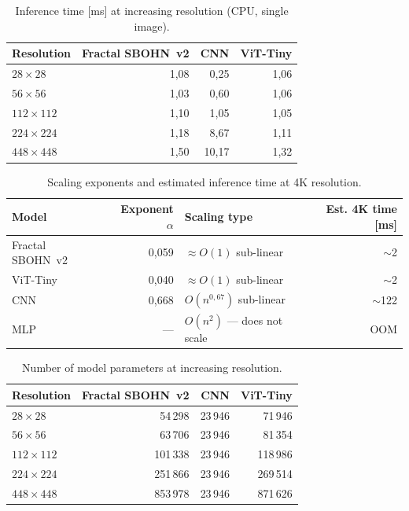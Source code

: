 \begin{table}[htbp]
\centering
\caption{Inference time [ms] at increasing resolution (CPU, single image).}
\label{tab:sota_inference}
\begin{tabular}{|l|r|r|r|}
\hline
\textbf{Resolution} & \textbf{Fractal SBOHN~v2} & \textbf{CNN} & \textbf{ViT-Tiny} \\
\hline
$28\times28$ & 1,08 & 0,25 & 1,06 \\
\hline
$56\times56$ & 1,03 & 0,60 & 1,06 \\
\hline
$112\times112$ & 1,10 & 1,05 & 1,05 \\
\hline
$224\times224$ & 1,18 & 8,67 & 1,11 \\
\hline
$448\times448$ & 1,50 & 10,17 & 1,32 \\
\hline
\end{tabular}
\end{table}

\begin{table}[htbp]
\centering
\caption{Scaling exponents and estimated inference time at 4K resolution.}
\label{tab:sota_scaling}
\begin{tabular}{|l|r|l|r|}
\hline
\textbf{Model} & \textbf{Exponent $\alpha$} & \textbf{Scaling type} & \textbf{Est. 4K time [ms]} \\
\hline
Fractal SBOHN~v2 & 0,059 & $\approx O(1)$ sub-linear & $\sim$2 \\
\hline
ViT-Tiny & 0,040 & $\approx O(1)$ sub-linear & $\sim$2 \\
\hline
CNN & 0,668 & $O(n^{0{,}67})$ sub-linear & $\sim$122 \\
\hline
MLP & --- & $O(n^2)$ --- does not scale & OOM \\
\hline
\end{tabular}
\end{table}

\begin{table}[htbp]
\centering
\caption{Number of model parameters at increasing resolution.}
\label{tab:sota_params}
\begin{tabular}{|l|r|r|r|}
\hline
\textbf{Resolution} & \textbf{Fractal SBOHN~v2} & \textbf{CNN} & \textbf{ViT-Tiny} \\
\hline
$28\times28$ & 54\,298 & 23\,946 & 71\,946 \\
\hline
$56\times56$ & 63\,706 & 23\,946 & 81\,354 \\
\hline
$112\times112$ & 101\,338 & 23\,946 & 118\,986 \\
\hline
$224\times224$ & 251\,866 & 23\,946 & 269\,514 \\
\hline
$448\times448$ & 853\,978 & 23\,946 & 871\,626 \\
\hline
\end{tabular}
\end{table}

